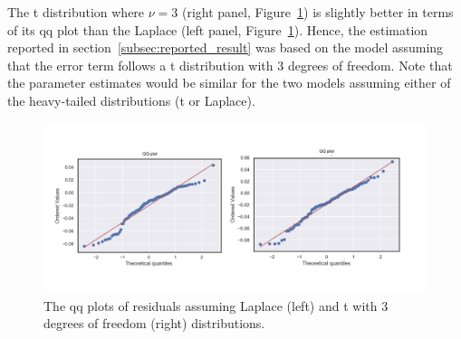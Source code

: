 The t distribution where $ \nu =3 $ (right panel, Figure~\ref{fig:qq_comp}) is slightly better in terms of its qq plot than the Laplace (left panel, Figure~\ref{fig:qq_comp}).
Hence, the estimation reported in section~\ref{subsec:reported_result} was based on the model assuming that the error term follows a t distribution with 3 degrees of freedom.
Note that the parameter estimates would be similar for the two models assuming either of the heavy-tailed distributions (t or Laplace).

\begin{figure}[htbp]
 \begin{center}
\includegraphics[width=1\textwidth]{../images/qq_plot_for_residuals.png}
\caption{The qq plots of residuals assuming Laplace (left) and t with 3 degrees of freedom (right) distributions.}
\label{fig:qq_comp}
 \end{center}
\end{figure}
